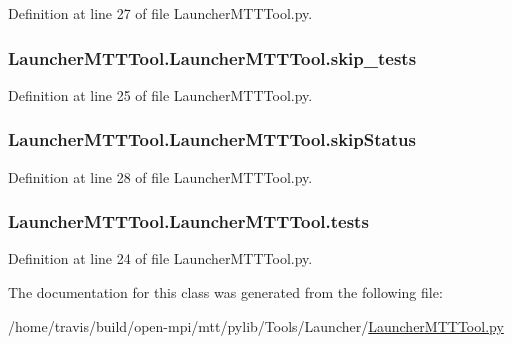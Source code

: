 Definition at line 27 of file Launcher\-M\-T\-T\-Tool.\-py.

\hypertarget{class_launcher_m_t_t_tool_1_1_launcher_m_t_t_tool_a03696ab743c22417d3be183903c20a68}{
\subsubsection[{skip\-\_\-tests}]{\setlength{\rightskip}{0pt plus 5cm}Launcher\-M\-T\-T\-Tool.\-Launcher\-M\-T\-T\-Tool.\-skip\-\_\-tests}}\label{class_launcher_m_t_t_tool_1_1_launcher_m_t_t_tool_a03696ab743c22417d3be183903c20a68}


Definition at line 25 of file Launcher\-M\-T\-T\-Tool.\-py.

\hypertarget{class_launcher_m_t_t_tool_1_1_launcher_m_t_t_tool_a4d5ba97c121703a52364ba25f4a2546b}{
\subsubsection[{skip\-Status}]{\setlength{\rightskip}{0pt plus 5cm}Launcher\-M\-T\-T\-Tool.\-Launcher\-M\-T\-T\-Tool.\-skip\-Status}}\label{class_launcher_m_t_t_tool_1_1_launcher_m_t_t_tool_a4d5ba97c121703a52364ba25f4a2546b}


Definition at line 28 of file Launcher\-M\-T\-T\-Tool.\-py.

\hypertarget{class_launcher_m_t_t_tool_1_1_launcher_m_t_t_tool_a2810a82208a2846540adffee0a6855f7}{
\subsubsection[{tests}]{\setlength{\rightskip}{0pt plus 5cm}Launcher\-M\-T\-T\-Tool.\-Launcher\-M\-T\-T\-Tool.\-tests}}\label{class_launcher_m_t_t_tool_1_1_launcher_m_t_t_tool_a2810a82208a2846540adffee0a6855f7}


Definition at line 24 of file Launcher\-M\-T\-T\-Tool.\-py.



The documentation for this class was generated from the following file\-:\begin{DoxyCompactItemize}
\item 
/home/travis/build/open-\/mpi/mtt/pylib/\-Tools/\-Launcher/\hyperlink{_launcher_m_t_t_tool_8py}{Launcher\-M\-T\-T\-Tool.\-py}\end{DoxyCompactItemize}
